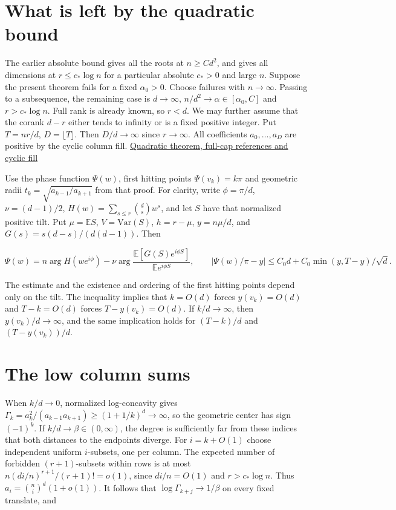 \section{What is left by the quadratic bound}

The earlier absolute bound gives all the roots at $n\ge C d^2$, and gives all dimensions at $r\le c_*\log n$ for a particular absolute $c_*>0$ and large $n$. Suppose the present theorem fails for a fixed $\alpha_0>0$. Choose failures with $n\to\infty$. Passing to a subsequence, the remaining case is $d\to\infty$, $n/d^2\to\alpha\in[\alpha_0,C]$ and $r>c_*\log n$. Full rank is already known, so $r<d$. We may further assume that the corank $d-r$ either tends to infinity or is a fixed positive integer. Put $T=nr/d$, $D=\lfloor T\rfloor$. Then $D/d\to\infty$ since $r\to\infty$. All coefficients $a_0,\ldots,a_D$ are positive by the cyclic column fill. \href{https://github.com/ProgramComputer/open-math-research/blob/4fb624ba937a8eecc1361a6066185cd81ab7b172/topics/balanced-arrays/quadratic/proof.md}{Quadratic theorem, full-cap references and cyclic fill}

Use the phase function $\Psi(w)$, first hitting points $\Psi(v_k)=k\pi$ and geometric radii $t_k=\sqrt{a_{k-1}/a_{k+1}}$ from that proof. For clarity, write $\phi=\pi/d$, $\nu=(d-1)/2$, $H(w)=\sum_{s\le r}\binom ds w^s$, and let $S$ have that normalized positive tilt. Put $\mu=\mathbb ES$, $V=\mathrm{Var}(S)$, $h=r-\mu$, $y=n\mu/d$, and $G(s)=s(d-s)/(d(d-1))$. Then

\begin{equation}
\Psi(w)=n\arg H(we^{i\phi})-\nu\arg\frac{\mathbb E[G(S)e^{i\phi S}]}{\mathbb E e^{i\phi S}},
\qquad
|\Psi(w)/\pi-y|\le C_0d+C_0\min(y,T-y)/\sqrt d .
\tag{M1}
\end{equation}

The estimate and the existence and ordering of the first hitting points depend only on the tilt. The inequality implies that $k=O(d)$ forces $y(v_k)=O(d)$ and $T-k=O(d)$ forces $T-y(v_k)=O(d)$. If $k/d\to\infty$, then $y(v_k)/d\to\infty$, and the same implication holds for $(T-k)/d$ and $(T-y(v_k))/d$.

\section{The low column sums}

When $k/d\to0$, normalized log-concavity gives $\Gamma_k=a_k^2/(a_{k-1}a_{k+1})\ge(1+1/k)^d\to\infty$, so the geometric center has sign $(-1)^k$. If $k/d\to\beta\in(0,\infty)$, the degree is sufficiently far from these indices that both distances to the endpoints diverge. For $i=k+O(1)$ choose independent uniform $i$-subsets, one per column. The expected number of forbidden $(r+1)$-subsets within rows is at most $n(di/n)^{r+1}/(r+1)!=o(1)$, since $di/n=O(1)$ and $r>c_*\log n$. Thus $a_i=\binom ni^d(1+o(1))$. It follows that $\log\Gamma_{k+j}\to1/\beta$ on every fixed translate, and

